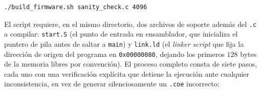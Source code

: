 \begin{lstlisting}[style=bashstyle]
./build_firmware.sh sanity_check.c 4096
\end{lstlisting}

El script requiere, en el mismo directorio, dos archivos de soporte
además del \texttt{.c} a compilar: \texttt{start.S} (el punto de entrada
en ensamblador, que inicializa el puntero de pila antes de saltar a
\texttt{main}) y \texttt{link.ld} (el \textit{linker script} que fija la
dirección de origen del programa en \texttt{0x00000080}, dejando los
primeros $128$ bytes de la memoria libres por convención). El proceso
completo consta de siete pasos, cada uno con una verificación explícita
que detiene la ejecución ante cualquier inconsistencia, en vez de
generar silenciosamente un \texttt{.coe} incorrecto:

